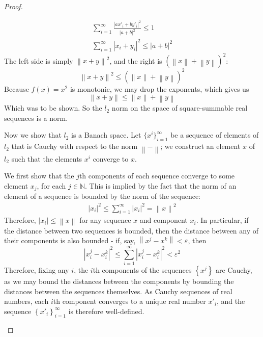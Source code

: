 \documentclass[12pt]{article}
\newcommand{\N}{\mathbb{N}}
\theoremstyle{definition}
\begin{document}
\begin{proof}
\begin{enumerate}[label=(\roman*)]
\begin{itemize}
			\begin{align*}
				\sum_{i=1}^\infty \frac{\left \lvert ax'_i + by'_i\right \rvert^2}{\left \lvert { a + b } \right \lvert^2} \leq 1\\
				\sum_{i=1}^\infty \left \lvert { x_i + y_i } \right \lvert ^2 \leq \left \lvert { a + b } \right \lvert ^2
			\end{align*}
			The left side is simply $\left \lVert { x+y } \right \lVert ^2$, and the right is $(\left \lVert { x } \right \lVert + \left \lVert { y } \right \lVert )^2$:
			\[\left \lVert { x+y } \right \lVert ^2 \leq (\left \lVert { x } \right \lVert + \left \lVert { y } \right \lVert )^2\]
			Because $f(x) = x^2$ is monotonic, we may drop the exponents, which gives us
			\[ \left \lVert { x+y } \right \lVert \leq \left \lVert { x } \right \lVert + \left \lVert { y } \right \lVert \]
			Which was to be shown. So the $l_2$ norm on the space of square-summable real sequences is a norm.
		\end{itemize}
		Now we show that $l_2$ is a Banach space. Let $\{x^i\}_{i=1}^\infty$ be a sequence of elements of $l_2$ that is Cauchy with respect to the norm $\left \lVert - \right \rVert$; we construct an element $x$ of $l_2$ such that the elements $x^i$ converge to $x$.
		\par We first show that the $j$th components of each sequence converge to some element $x_j$, for each $j \in \N$. This is implied by the fact that the norm of an element of a sequence is bounded by the norm of the sequence:
		\begin{align*}
		    \left \lvert x_i \right \rvert^2 \leq \sum_{i=1}^\infty \left \lvert x_i \right \rvert^2
		    = \left \lVert x \right \rVert^2
		\end{align*}
		Therefore, $\left \lvert x_i \right \rvert \leq \left \lVert x \right \rVert$ for any sequence $x$ and component $x_i$. In particular, if the distance between two sequences is bounded, then the distance between any of their components is also bounded - if, say, $\left \lVert { x^j - x^k } \right \lVert < \varepsilon$, then
		\[\left \lvert { x^j_i - x^k_i} \right \lvert ^2 \leq \sum_{i=1}^\infty \left \lvert { x^j_i - x^k_i } \right \lvert ^2 < \varepsilon^2 \]
		Therefore, fixing any $i$, the $i$th components of the sequences $\left\{ x^j \right\}$ are Cauchy, as we may bound the distances between the components by bounding the distances between the sequences themselves. As Cauchy sequences of real numbers, each $i$th component converges to a unique real number $x'_i$, and the sequence $\left\{ x'_i \right\}_{i=1}^\infty$ is therefore well-defined. 

\end{enumerate}
\end{proof}
\end{document}
